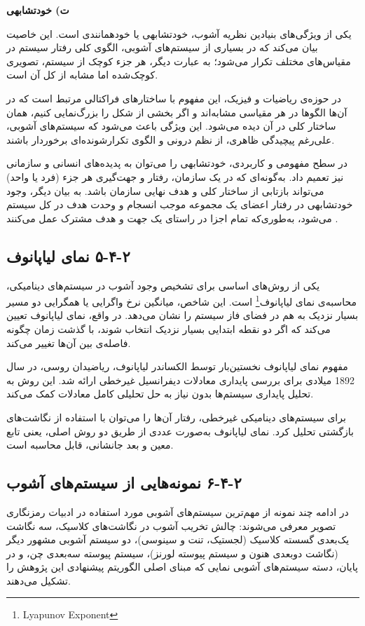 \textbf{ت) خودتشابهی}

یکی از ویژگی‌های بنیادین نظریه آشوب، خودتشابهی یا خودهمانندی است. این خاصیت بیان می‌کند که در بسیاری از سیستم‌های آشوبی، الگوی کلی رفتار سیستم در مقیاس‌های مختلف تکرار می‌شود؛ به عبارت دیگر، هر جزء کوچک از سیستم، تصویری کوچک‌شده اما مشابه از کل آن است.

در حوزه‌ی ریاضیات و فیزیک، این مفهوم با ساختارهای فراکتالی مرتبط است که در آن‌ها الگوها در هر مقیاسی مشابه‌اند و اگر بخشی از شکل را بزرگ‌نمایی کنیم، همان ساختار کلی در آن دیده می‌شود. این ویژگی باعث می‌شود که سیستم‌های آشوبی، علی‌رغم پیچیدگی ظاهری، از نظم درونی و الگوی تکرارشونده‌ای برخوردار باشند.

در سطح مفهومی و کاربردی، خودتشابهی را می‌توان به پدیده‌های انسانی و سازمانی نیز تعمیم داد. به‌گونه‌ای که در یک سازمان، رفتار و جهت‌گیری هر جزء (فرد یا واحد) می‌تواند بازتابی از ساختار کلی و هدف نهایی سازمان باشد. به بیان دیگر، وجود خودتشابهی در رفتار اعضای یک مجموعه موجب انسجام و وحدت هدف در کل سیستم می‌شود، به‌طوری‌که تمام اجزا در راستای یک جهت و هدف مشترک عمل می‌کنند \cite{ref27}.

\subsection{‏۲‏-‏۴‏-‏۵‏ نمای لیاپانوف}

یکی از روش‌های اساسی برای تشخیص وجود آشوب در سیستم‌های دینامیکی، محاسبه‌ی نمای لیاپانوف\footnote{Lyapunov Exponent} است. این شاخص، میانگین نرخ واگرایی یا همگرایی دو مسیر بسیار نزدیک به هم در فضای فاز سیستم را نشان می‌دهد. در واقع، نمای لیاپانوف تعیین می‌کند که اگر دو نقطه ابتدایی بسیار نزدیک انتخاب شوند، با گذشت زمان چگونه فاصله‌ی بین آن‌ها تغییر می‌کند.

مفهوم نمای لیاپانوف نخستین‌بار توسط الکساندر لیاپانوف، ریاضیدان روسی، در سال 1892 میلادی برای بررسی پایداری معادلات دیفرانسیل غیرخطی ارائه شد. این روش به تحلیل پایداری سیستم‌ها بدون نیاز به حل تحلیلی کامل معادلات کمک می‌کند.

برای سیستم‌های دینامیکی غیرخطی، رفتار آن‌ها را می‌توان با استفاده از نگاشت‌های بازگشتی تحلیل کرد. نمای لیاپانوف به‌صورت عددی از طریق دو روش اصلی، یعنی تابع معین و بعد جانشانی، قابل محاسبه است.

\subsection{‏۲‏-‏۴‏-‏۶‏ نمونه‌هایی از سیستم‌های آشوب}

در ادامه چند نمونه از مهم‌ترین سیستم‌های آشوبی مورد استفاده در ادبیات رمزنگاری تصویر معرفی می‌شوند: چالش تخریب آشوب در نگاشت‌های کلاسیک، سه نگاشت یک‌بعدی گسسته کلاسیک (لجستیک، تنت و سینوسی)، دو سیستم آشوبی مشهور دیگر (نگاشت دوبعدی هنون و سیستم پیوسته لورنز)، سیستم پیوسته سه‌بعدی چن، و در پایان، دسته سیستم‌های آشوبی نمایی که مبنای اصلی الگوریتم پیشنهادی این پژوهش را تشکیل می‌دهند.

